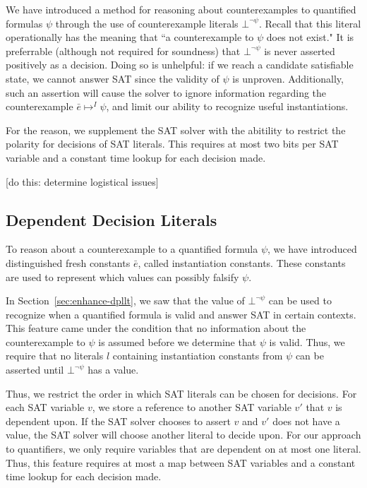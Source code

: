 \documentclass{llncs}
\begin{document}
We have introduced a method for reasoning about counterexamples to quantified formulas $\psi$ through the use of counterexample literals $\bot^{\neg \psi}$.
Recall that this literal operationally has the meaning that ``a counterexample to $\psi$ does not exist."
It is preferrable (although not required for soundness) that $\bot^{\neg \psi}$ is never asserted positively as a decision.
Doing so is unhelpful:  if we reach a candidate satisfiable state, we cannot answer SAT since the validity of $\psi$ is unproven.
Additionally, such an assertion will cause the solver to ignore information regarding the counterexample $\bar{e} \mapsto^I \psi$, and limit our ability to recognize useful instantiations.

For the reason, we supplement the SAT solver with the abitility to restrict the polarity for decisions of SAT literals.
This requires at most two bits per SAT variable and a constant time lookup for each decision made.

[do this: determine logistical issues]

\subsection{Dependent Decision Literals}

To reason about a counterexample to a quantified formula $\psi$, we have introduced distinguished fresh constants $\bar{e}$, called instantiation constants.
These constants are used to represent which values can possibly falsify $\psi$.

In Section~\ref{sec:enhance-dpllt}, we saw that the value of $\bot^{\neg \psi}$ can be used to recognize when a quantified formula is valid and answer SAT in certain contexts.
This feature came under the condition that no information about the counterexample to $\psi$ is assumed before we determine that $\psi$ is valid.
Thus, we require that no literals $l$ containing instantiation constants from $\psi$ can be asserted until $\bot^{ \neg \psi }$ has a value.

Thus, we restrict the order in which SAT literals can be chosen for decisions.
For each SAT variable $v$, we store a reference to another SAT variable $v'$ that $v$ is dependent upon.
If the SAT solver chooses to assert $v$ and $v'$ does not have a value, the SAT solver will choose another literal to decide upon.
For our approach to quantifiers, we only require variables that are dependent on at most one literal.
Thus, this feature requires at most a map between SAT variables and a constant time lookup for each decision made.
\end{document}
